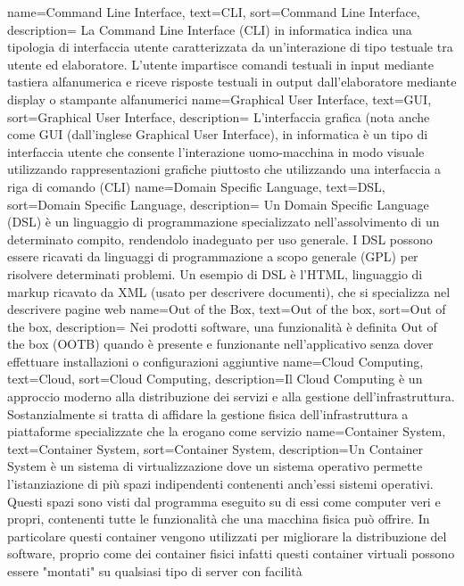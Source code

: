 {
	name=Command Line Interface,
	text=CLI,
	sort=Command Line Interface,
	description={ La Command Line Interface (CLI) in informatica indica una tipologia di interfaccia utente caratterizzata da un'interazione di tipo testuale tra utente ed elaboratore. L'utente impartisce comandi testuali in input mediante tastiera alfanumerica e riceve risposte testuali in output dall'elaboratore mediante display o stampante alfanumerici}
}
{
	name=Graphical User Interface,
	text=GUI,
	sort=Graphical User Interface,
	description={ L'interfaccia grafica (nota anche come GUI (dall'inglese Graphical User Interface), in informatica è un tipo di interfaccia utente che consente l'interazione uomo-macchina in modo visuale utilizzando rappresentazioni grafiche piuttosto che utilizzando una interfaccia a riga di comando (CLI)}
}
{
	name=Domain Specific Language,
	text=DSL,
	sort=Domain Specific Language,
	description={ Un Domain Specific Language (DSL) è un linguaggio di programmazione specializzato nell'assolvimento di un determinato compito, rendendolo inadeguato per uso generale. I DSL possono essere ricavati da linguaggi di programmazione a scopo generale (GPL) per risolvere determinati problemi. Un esempio di DSL è l'HTML, linguaggio di markup ricavato da XML (usato per descrivere documenti), che si specializza nel descrivere pagine web}
}
{
	name=Out of the Box,
	text=Out of the box,
	sort=Out of the box,
	description={ Nei prodotti software, una funzionalità è definita Out of the box (OOTB) quando è presente e funzionante nell'applicativo senza dover effettuare installazioni o configurazioni aggiuntive}
}
{
	name=Cloud Computing,
	text=Cloud,
	sort=Cloud Computing,
	description={Il Cloud Computing è un approccio moderno alla distribuzione dei servizi e alla gestione dell’infrastruttura. Sostanzialmente si tratta di affidare la gestione fisica dell’infrastruttura a piattaforme specializzate che la erogano come servizio}
}
{
	name=Container System,
	text=Container System,
	sort=Container System,
	description={Un Container System è un sistema di virtualizzazione dove un sistema operativo permette l'istanziazione di più spazi indipendenti contenenti anch'essi sistemi operativi. Questi spazi sono visti dal programma eseguito su di essi come computer veri e propri, contenenti tutte le funzionalità che una macchina fisica può offrire. In particolare questi container vengono utilizzati per migliorare la distribuzione del software, proprio come dei container fisici infatti questi container virtuali possono essere "montati" su qualsiasi tipo di server con facilità}
}
